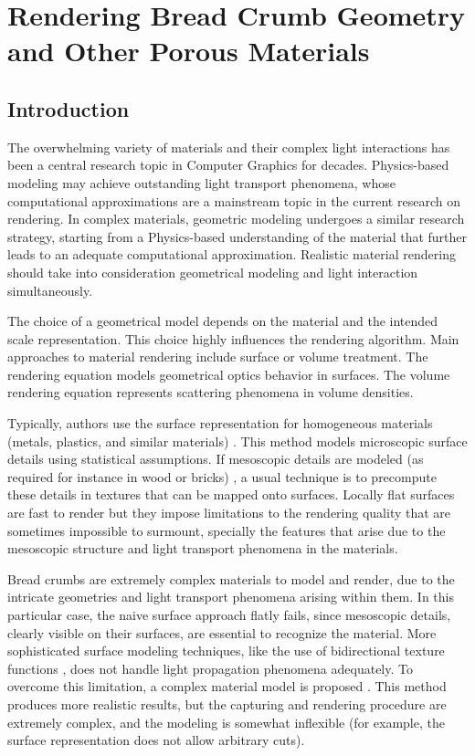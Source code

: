 
\chapter[Rendering Bread Crumb Geometry]{Rendering Bread Crumb Geometry and Other Porous Materials}
\section{Introduction}



The overwhelming variety of materials and their complex light interactions has been a central research topic in Computer Graphics for decades. 
Physics-based modeling may achieve outstanding light transport phenomena, whose computational approximations are a mainstream topic in the current research on rendering.
In complex materials, geometric modeling undergoes a similar research strategy, starting from a Physics-based understanding of the material that further leads to an adequate computational approximation.
Realistic material rendering should take into consideration geometrical modeling and light interaction simultaneously.

The choice of a geometrical model depends on the material and the intended scale representation.
This choice highly influences the rendering algorithm. Main approaches to material rendering include surface or volume treatment. 
The rendering equation \cite{Kajiya1986} models geometrical optics behavior in surfaces. 
The volume rendering equation \cite{Kajiya1984} represents scattering phenomena in volume densities.

Typically, authors use the surface representation for homogeneous materials (metals, plastics, and similar materials) \cite{Neumann1999}.
This method models microscopic surface details using statistical assumptions.
If mesoscopic details are modeled (as required for instance in wood or bricks) \cite{Lefebvre2000}, a usual technique is to precompute these details in textures that can be mapped onto surfaces.
Locally flat surfaces are fast to render but they impose limitations to the rendering quality that are sometimes impossible to surmount, specially the features that arise due to the mesoscopic structure and light transport phenomena in the materials.

Bread crumbs are extremely complex materials to model and render, due to the intricate geometries and light transport phenomena arising within them.
In this particular case, the naive surface approach flatly fails, since mesoscopic details, clearly visible on their surfaces, are essential to recognize the material.
More sophisticated surface modeling techniques, like the use of bidirectional texture functions \cite{Tong2002}, does not handle light propagation phenomena adequately.
To overcome this limitation, a complex material model is proposed \cite{Tong2005}.
This method produces more realistic results, but the capturing and rendering procedure are extremely complex, and the modeling is somewhat inflexible (for example, the surface representation does not allow arbitrary cuts).



